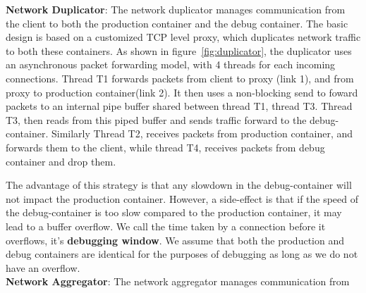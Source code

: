 \iffalse	
	\begin{figure}[ht]
		\begin{centering}
			\texttt{[image: figs/network\_dup.pdf]}
			\caption{Description of the Network Duplicator. In \textit{synchronized} mode: Thread 1 executes steps [1,3,5], and Thread 2 executes [2,4,6] sequentially. In \textit{asynchronous} mode: Thread 1 executes steps [1,3], Thread 2 executes [2,4], Thread 3 executes [5], and Thread 4 executes [6]}
			\label{fig:duplicator}
		\end{centering}
	\end{figure}
\fi
 \textbf{Network Duplicator}: The network duplicator manages communication from the client to both the production container and the debug container.
The basic design is based on a customized TCP level proxy, which duplicates network traffic to both these containers.
As shown in figure~\ref{fig:duplicator}, the duplicator uses an asynchronous packet forwarding model, with 4 threads for each incoming connections.
Thread T1 forwards packets from client to proxy (link 1), and from proxy to production container(link 2). It then uses a non-blocking send to foward packets to an internal pipe buffer shared between thread T1, thread T3. Thread T3, then reads from this piped buffer and sends traffic forward to the debug-container. 
Similarly Thread T2, receives packets from production container, and forwards them to the client, while thread T4, receives packets from debug container and drop them. 

The advantage of this strategy is that any slowdown in the debug-container will not impact the production container.
However, a side-effect is that if the speed of the debug-container is too slow compared to the production container, it may lead to a buffer overflow. 
We call the time taken by a connection before it overflows, it's \textbf{debugging window}.
We assume that both the production and debug containers are identical for the purposes of debugging as long as we do not have an overflow. \\

\textbf{Network Aggregator}: The network aggregator manages communication from 
	
